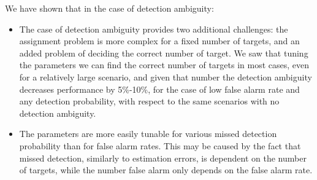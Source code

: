 We have shown that in the case of detection ambiguity:
\begin{itemize}
\item The case of detection ambiguity provides two additional challenges: the assignment problem is more complex for a fixed number of targets, and an added problem of deciding the correct number of target. We saw that tuning the parameters we can find the correct number of targets in most cases, even for a relatively large scenario, and given that number the detection ambiguity decreases performance by 5\%-10\%,  for the case of low false alarm rate and any detection probability, with respect to the same scenarios with no detection ambiguity.
\item The parameters are more easily tunable for various missed detection probability than for false alarm rates. This may be caused by the fact that missed detection, similarly to estimation errors, is dependent on the number of targets, while the number false alarm only depends on the false alarm rate. 

\end{itemize}